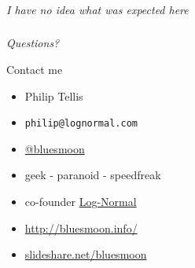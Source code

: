 \documentclass{beamer}
\newcommand{\innersplash}[1]{
  \begin{center}
    \large \textrm{\textit{ #1 } }
  \end{center}
}
\newcommand{\splashslide}[2][{}]{
  \begin{frame}
  \frametitle{#1}
  \innersplash{#2}
  \end{frame}
}
\begin{document}
\splashslide{\LARGE I have no idea what was expected here}

\splashslide{\LARGE Questions?}

\begin{frame}{Contact me}
  \begin{itemize}
  \item Philip Tellis
  \item \small{\texttt{philip@lognormal.com}}
  \item \href{http://twitter.com/bluesmoon}{@bluesmoon}
  \item geek - paranoid - speedfreak
  \item co-founder \href{http://www.lognormal.com/}{Log-Normal}
  \item \href{http://bluesmoon.info/}{http://bluesmoon.info/}
  \item \href{http://www.slideshare.net/bluesmoon}{slideshare.net/bluesmoon}
  \end{itemize}
\end{frame}
\end{document}
